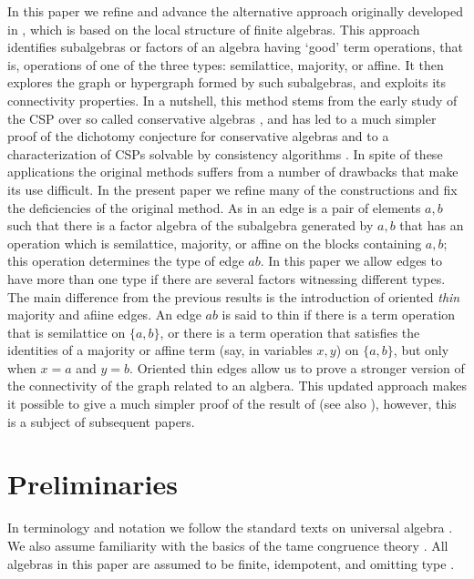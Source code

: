 \documentclass[11pt]{article}
\begin{document}
In this paper we refine and advance the alternative approach originally developed in 
\cite{Bulatov04:graph,Bulatov11:conjecture,Bulatov08:recent}, which is based on the 
local structure of finite algebras. This 
approach identifies subalgebras or factors of an algebra having `good' term operations,
that is, operations of one of the three types: semilattice, majority, or affine. It then explores 
the graph or hypergraph formed by such subalgebras, and exploits its connectivity properties.
In a nutshell, this method stems from  the early study of the CSP over so called conservative 
algebras \cite{Bulatov11:conservative}, and has led to a much simpler proof of the dichotomy
conjecture for conservative algebras \cite{Bulatov16:conservative} and to a characterization of 
CSPs solvable by consistency algorithms \cite{Bulatov09:bounded}. In spite of these applications
the original methods suffers from a number of drawbacks that make its use difficult. In the
present paper we refine many of the constructions and fix the deficiencies of the original
method. As in \cite{Bulatov04:graph,Bulatov08:recent} an edge is a pair of elements $a,b$
such that there is a factor algebra of the subalgebra generated by $a,b$ that has an
operation which is semilattice, majority, or affine on the blocks containing $a,b$; this
operation determines the type of edge $ab$. In this paper we allow edges to have more 
than one type if there are several factors witnessing different types. The main difference
from the previous results is the introduction of oriented \emph{thin} majority and afiine edges.
An edge $ab$ is said to thin if there is a term operation that is semilattice on $\{a,b\}$, or 
there is a term operation that satisfies the identities of a majority or affine term (say, in
variables $x,y$) on $\{a,b\}$, but only when $x=a$ and $y=b$. Oriented thin edges
allow us to prove a stronger version of the connectivity of the graph related to an algbera. 
This updated approach makes it possible to give a much simpler proof of the 
result of \cite{Bulatov09:bounded} (see also \cite{Barto14:local}), however, this is a subject
of subsequent papers. 


\section{Preliminaries}\label{sec:preliminaries}

In terminology and notation we follow the standard texts on universal algebra
\cite{Burris81:universal,Mckenzie87:algebras}. We also assume familiarity with
the basics of the tame congruence theory \cite{Hobby88:structure}. All algebras in this paper
are assumed to be finite, idempotent, and omitting type \one.
\end{document}
